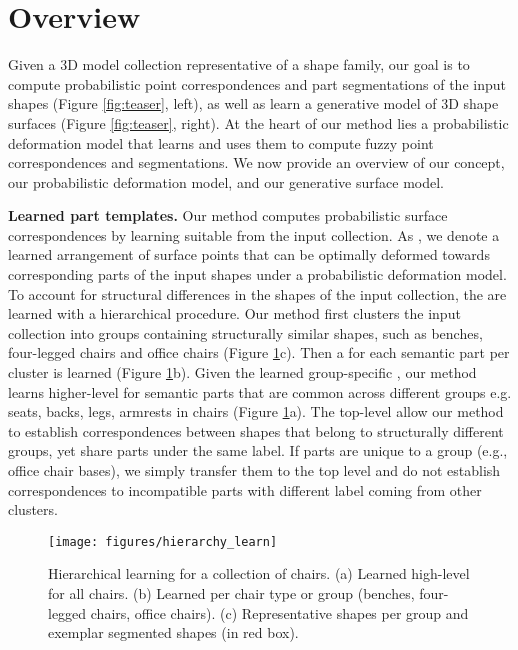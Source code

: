 \section{Overview}
\label{sec:overview}

Given a 3D model collection representative of a shape family, our goal is to compute probabilistic point correspondences and part segmentations of the input shapes (Figure \ref{fig:teaser}, left), as well as learn a generative model of 3D shape surfaces (Figure \ref{fig:teaser}, right). At the heart of our method lies a probabilistic deformation model that learns  and uses them to compute fuzzy point correspondences and segmentations. We now provide an overview of our  concept, our probabilistic deformation model, and our generative surface model. 

\textbf{Learned part templates.} Our method computes probabilistic surface correspondences by learning suitable  from the input collection. As , we denote a learned arrangement of surface points that can be optimally deformed towards corresponding parts of the input shapes under a probabilistic deformation model. To account for structural differences in the shapes of the input collection, the  are learned with a hierarchical procedure. Our method first clusters the input collection into groups containing structurally similar shapes, such as benches, four-legged chairs and office chairs (Figure \ref{fig:hierarchy}c). Then a  for each semantic part per cluster is learned (Figure \ref{fig:hierarchy}b). Given the learned group-specific , our method learns higher-level  for semantic parts that are common across different groups e.g. seats, backs, legs, armrests in chairs (Figure \ref{fig:hierarchy}a). The top-level  allow our method to establish correspondences between shapes that belong to structurally different groups, yet share parts under the same label. If parts are unique to a group (e.g., office chair bases), we simply transfer them to the top level and do not establish correspondences to incompatible parts with different label coming from other clusters.

\begin{figure}[t]
\centering
\texttt{[image: figures/hierarchy\_learn]}
\vskip -2mm
\caption{Hierarchical  learning for a collection of chairs. (a) Learned high-level  for all chairs. (b) Learned  per chair type or group (benches, four-legged chairs, office chairs). (c) Representative shapes per group and exemplar segmented shapes (in red box). }
\vskip -8mm
\label{fig:hierarchy}
\end{figure}

